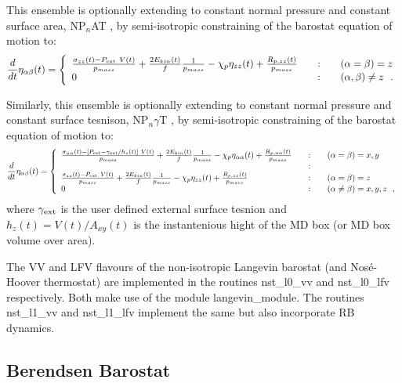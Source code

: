 This ensemble is optionally extending to constant normal pressure
and constant surface area, NP$_{n}$AT \cite{ikeguchi-04}, by semi-isotropic
constraining of the barostat equation of motion to:
\begin{equation}
\frac{d}{dt} \eta_{\alpha\beta}(t) = \left\{ \begin{array} {l@{\qquad:\qquad}l}
\frac{\sigma_{zz}(t) - P_{\rm ext}~V(t)}{p_{mass}} + \frac{2 E_{kin}(t)}{f} \frac{1}{p_{mass}} -
\chi_{p} \eta_{zz}(t) + \frac{R_{p,zz}(t)}{p_{mass}} & (\alpha = \beta) = z \\
0 & (\alpha,\beta) \ne z~~.
\end{array} \right.
\end{equation}

Similarly, this ensemble is optionally extending to constant
normal pressure and constant surface tesnison, NP$_{n}\gamma$T
\cite{ikeguchi-04}, by semi-isotropic constraining of the
barostat equation of motion to:
\begin{equation}
\frac{d}{dt} \eta_{\alpha\beta}(t) = \left\{ \begin{array} {l@{\qquad:\qquad}l}
\frac{\sigma_{\alpha\alpha}(t) - \left[ P_{\rm ext} - \gamma_{\rm ext} / h_{z}(t) \right]~V(t)}{p_{mass}} +
\frac{2 E_{kin}(t)}{f} \frac{1}{p_{mass}} - \chi_{p} \eta_{\alpha\alpha}(t) +
\frac{R_{p,\alpha\alpha}(t)}{p_{mass}} & (\alpha = \beta) = x,y \\
& \\
\frac{\sigma_{zz}(t) - P_{\rm ext}~V(t)}{p_{mass}} +
\frac{2 E_{kin}(t)}{f} \frac{1}{p_{mass}} - \chi_{p} \eta_{zz}(t) +
\frac{R_{p,zz}(t)}{p_{mass}} & (\alpha = \beta) = z \\
0 & (\alpha \ne \beta) = x,y,z~~,
\end{array} \right.
\end{equation}
where $\gamma_{\rm ext}$ is the user defined external surface tesnion
and $h_{z}(t) = V(t) / A_{xy}(t)$ is the instantenious hight of the
MD box (or MD box volume over area).

The VV and LFV flavours of the non-isotropic Langevin barostat
(and Nos\'{e}-Hoover thermostat) are implemented in the \D routines
{\sc nst\_l0\_vv} and {\sc nst\_l0\_lfv} respectively.  Both make
use of the \D module {\sc langevin\_module}.  The routines
{\sc nst\_l1\_vv} and {\sc nst\_l1\_lfv} implement the
same but also incorporate RB dynamics.

\subsection{Berendsen Barostat}

